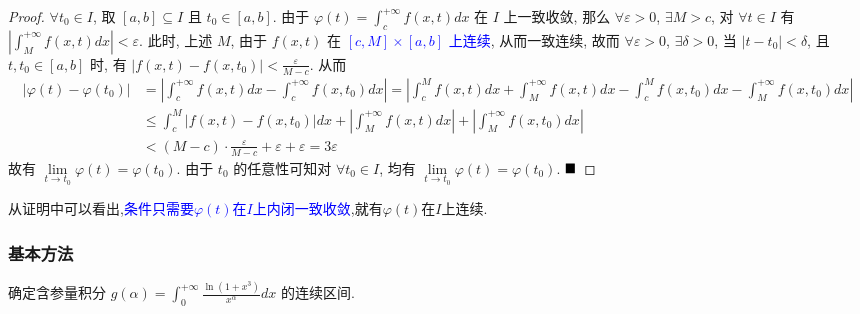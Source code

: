 \documentclass[lang=cn,newtx,10pt,scheme=chinese]{elegantbook}
\begin{document}
\begin{proof}
$\forall t_0 \in I$, 取 $[a,b] \subseteq I$ 且 $t_0 \in [a,b]$. 由于 $\varphi(t) = \int_{c}^{+\infty} f(x,t) dx$ 在 $I$ 上一致收敛, 那么 $\forall \varepsilon > 0$, $\exists M > c$, 对 $\forall t \in I$ 有 $|\int_{M}^{+\infty} f(x,t) dx| < \varepsilon$.
此时, 上述 $M$, 由于 $f(x,t)$ 在 \textcolor{blue}{$[c,M] \times [a,b]$ 上连续}, 从而一致连续, 故而 $\forall \varepsilon > 0$, $\exists \delta > 0$, 当 $|t-t_0| < \delta$, 且 $t, t_0 \in [a,b]$ 时, 有 $|f(x,t) - f(x,t_0)| < \frac{\varepsilon}{M-c}$.
从而
\begin{align*} |\varphi(t) - \varphi(t_0)| &= \left|\int_{c}^{+\infty} f(x,t) dx - \int_{c}^{+\infty} f(x,t_0) dx\right| = \left|\int_{c}^{M} f(x,t) dx + \int_{M}^{+\infty} f(x,t) dx - \int_{c}^{M} f(x,t_0) dx - \int_{M}^{+\infty} f(x,t_0) dx\right| \\ &\le \int_{c}^{M} |f(x,t) - f(x,t_0)| dx + \left|\int_{M}^{+\infty} f(x,t) dx\right| + \left|\int_{M}^{+\infty} f(x,t_0) dx\right| \\ &< (M-c) \cdot \frac{\varepsilon}{M-c} + \varepsilon + \varepsilon = 3\varepsilon \end{align*}
故有 $\lim\limits_{t \to t_0} \varphi(t) = \varphi(t_0)$. 由于 $t_0$ 的任意性可知对 $\forall t_0 \in I$, 均有 $\lim\limits_{t \to t_0} \varphi(t) = \varphi(t_0)$. $\hfill \blacksquare$
\end{proof}

\begin{remark}
    从证明中可以看出,\textcolor{blue}{条件只需要$\varphi(t)$在$I$上内闭一致收敛},就有$\varphi(t)$在$I$上连续.
\end{remark}
\subsubsection*{基本方法}

\begin{example}[$\bigstar \bigstar$]
确定含参量积分 $g(\alpha) = \int_{0}^{+\infty} \frac{\ln(1+x^3)}{x^\alpha} dx$ 的连续区间.
\end{example}
\end{document}
